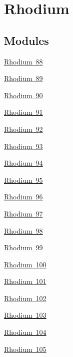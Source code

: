 \hypertarget{group___isotope_const-_rhodium}{}\section{Rhodium}
\label{group___isotope_const-_rhodium}
\subsection*{Modules}
\begin{DoxyCompactItemize}
\item 
\mbox{\hyperlink{group___isotope_const-_rhodium-_rh88}{Rhodium 88}}
\item 
\mbox{\hyperlink{group___isotope_const-_rhodium-_rh89}{Rhodium 89}}
\item 
\mbox{\hyperlink{group___isotope_const-_rhodium-_rh90}{Rhodium 90}}
\item 
\mbox{\hyperlink{group___isotope_const-_rhodium-_rh91}{Rhodium 91}}
\item 
\mbox{\hyperlink{group___isotope_const-_rhodium-_rh92}{Rhodium 92}}
\item 
\mbox{\hyperlink{group___isotope_const-_rhodium-_rh93}{Rhodium 93}}
\item 
\mbox{\hyperlink{group___isotope_const-_rhodium-_rh94}{Rhodium 94}}
\item 
\mbox{\hyperlink{group___isotope_const-_rhodium-_rh95}{Rhodium 95}}
\item 
\mbox{\hyperlink{group___isotope_const-_rhodium-_rh96}{Rhodium 96}}
\item 
\mbox{\hyperlink{group___isotope_const-_rhodium-_rh97}{Rhodium 97}}
\item 
\mbox{\hyperlink{group___isotope_const-_rhodium-_rh98}{Rhodium 98}}
\item 
\mbox{\hyperlink{group___isotope_const-_rhodium-_rh99}{Rhodium 99}}
\item 
\mbox{\hyperlink{group___isotope_const-_rhodium-_rh100}{Rhodium 100}}
\item 
\mbox{\hyperlink{group___isotope_const-_rhodium-_rh101}{Rhodium 101}}
\item 
\mbox{\hyperlink{group___isotope_const-_rhodium-_rh102}{Rhodium 102}}
\item 
\mbox{\hyperlink{group___isotope_const-_rhodium-_rh103}{Rhodium 103}}
\item 
\mbox{\hyperlink{group___isotope_const-_rhodium-_rh104}{Rhodium 104}}
\item 
\mbox{\hyperlink{group___isotope_const-_rhodium-_rh105}{Rhodium 105}}

\end{DoxyCompactItemize}
